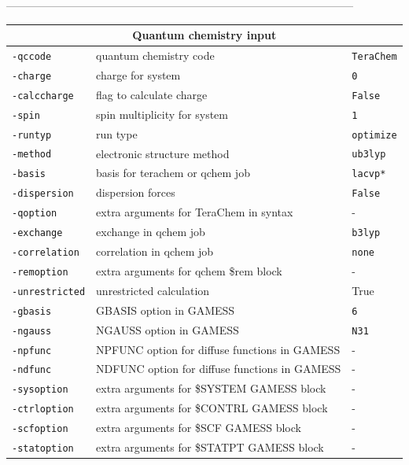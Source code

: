 \documentclass[a4paper,12pt]{assignment}
\begin{document}
 ----------------------------------------------------------------------------------------------- %
\begin{tabular}{|l|l|l|}
\hline
 \multicolumn{3}{|c|}{\Large \textbf{Quantum chemistry input}}\\ \hline 
\texttt{-qccode} & quantum chemistry code & \texttt{TeraChem} \\
\texttt{-charge} & charge for system & \texttt{0} \\
\texttt{-calccharge} & flag to calculate charge & \texttt{False} \\
\texttt{-spin} & spin multiplicity for system  & \texttt{1} \\
\texttt{-runtyp} & run type  & \texttt{optimize} \\
\texttt{-method} & electronic structure method & \texttt{ub3lyp} \\
\texttt{-basis} & basis for terachem or qchem job  & \texttt{lacvp*} \\
\texttt{-dispersion} & dispersion forces & \texttt{False} \\
\texttt{-qoption} & extra arguments for TeraChem in syntax& - \\
\texttt{-exchange} & exchange in qchem job  & \texttt{b3lyp} \\
\texttt{-correlation} & correlation in qchem job  & \texttt{none} \\
\texttt{-remoption} & extra arguments for qchem \$rem block& - \\
\texttt{-unrestricted} & unrestricted calculation & True \\
\texttt{-gbasis} & GBASIS option in GAMESS & \texttt{6} \\
\texttt{-ngauss} & NGAUSS option in GAMESS  & \texttt{N31} \\
\texttt{-npfunc} & NPFUNC option for diffuse functions in GAMESS  & - \\
\texttt{-ndfunc} & NDFUNC option for diffuse functions in GAMESS  & - \\
\texttt{-sysoption} & extra arguments for \$SYSTEM GAMESS block & - \\
\texttt{-ctrloption} & extra arguments for \$CONTRL GAMESS block & - \\
\texttt{-scfoption} & extra arguments for \$SCF GAMESS block & - \\
\texttt{-statoption} & extra arguments for \$STATPT GAMESS block & - \\
\hline
\end{tabular}
\end{document}
